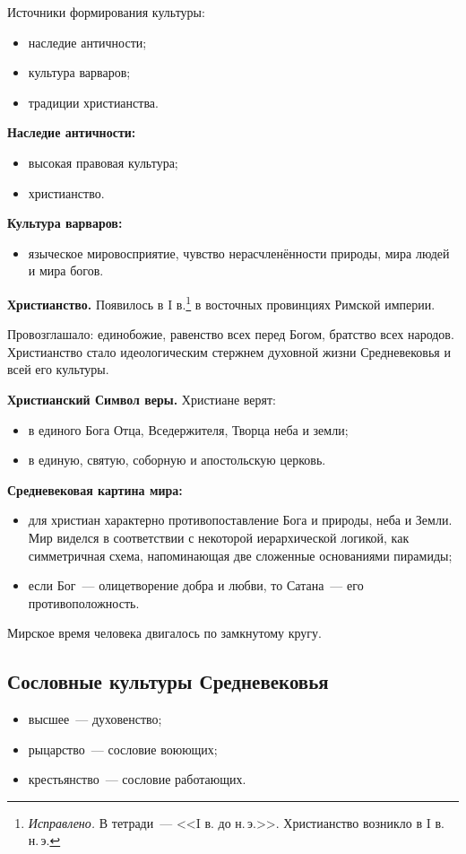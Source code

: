 \documentclass[a4paper, 12pt]{article}
\begin{document}
Источники формирования культуры:
\begin{itemize}[noitemsep]
  \item наследие античности;
  \item культура варваров;
  \item традиции христианства.
\end{itemize}

\textbf{Наследие античности:}
\begin{itemize}[noitemsep]
  \item высокая правовая культура;
  \item христианство.
\end{itemize}

\textbf{Культура варваров:}
\begin{itemize}[noitemsep]
  \item языческое мировосприятие, чувство нерасчленённости природы, мира
  людей и мира богов.
\end{itemize}

\textbf{Христианство.} Появилось в I в.\footnote{\textit{Исправлено.} В
тетради~--- <<I в. до н.\,э.>>. Христианство возникло в I в. н.\,э.}
в восточных провинциях Римской империи.

Провозглашало: единобожие, равенство всех перед Богом, братство всех
народов. Христианство стало идеологическим стержнем духовной жизни
Средневековья и всей его культуры.

\textbf{Христианский Символ веры.} Христиане верят:
\begin{itemize}[noitemsep]
  \item в единого Бога Отца, Вседержителя, Творца неба и земли;
  \item в единую, святую, соборную и апостольскую церковь.
\end{itemize}

\textbf{Средневековая картина мира:}
\begin{itemize}[noitemsep]
  \item для христиан характерно противопоставление Бога и природы, неба
  и Земли. Мир виделся в соответствии с некоторой иерархической логикой, как
  симметричная схема, напоминающая две сложенные основаниями пирамиды;
  \item если Бог~--- олицетворение добра и любви, то Сатана~--- его
  противоположность.
\end{itemize}

Мирское время человека двигалось по замкнутому кругу.

\subsection{Сословные культуры Средневековья}
\begin{itemize}[noitemsep]
  \item высшее~--- духовенство;
  \item рыцарство~--- сословие воюющих;
  \item крестьянство~--- сословие работающих.
\end{itemize}
\end{document}
